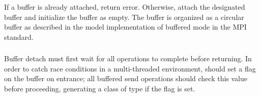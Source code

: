 \documentclass{article}
\begin{document}
\subsubsection{}

If a buffer is already attached, return error.
Otherwise, attach the designated buffer and initialize the buffer as empty.
The buffer is organized as a circular buffer as described in the model
implementation of buffered mode in the MPI standard.


\subsubsection{}
Buffer detach must first wait for all operations to complete before
returning.  
In order to catch race conditions in a multi-threaded environment, 
 should set a flag on the buffer on entrance; all
buffered send operations should check this value before proceeding, generating
a  class of type  if the flag is
set.
\end{document}
